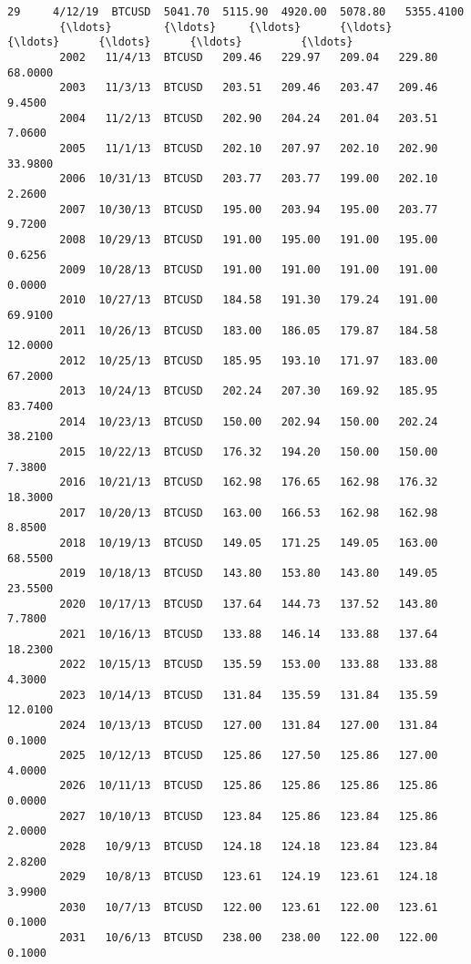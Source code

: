 \documentclass[11pt]{article}
\begin{document}
\begin{Verbatim}[commandchars=\\\{\}]
        29     4/12/19  BTCUSD  5041.70  5115.90  4920.00  5078.80   5355.4100   
        {\ldots}        {\ldots}     {\ldots}      {\ldots}      {\ldots}      {\ldots}      {\ldots}         {\ldots}   
        2002   11/4/13  BTCUSD   209.46   229.97   209.04   229.80     68.0000   
        2003   11/3/13  BTCUSD   203.51   209.46   203.47   209.46      9.4500   
        2004   11/2/13  BTCUSD   202.90   204.24   201.04   203.51      7.0600   
        2005   11/1/13  BTCUSD   202.10   207.97   202.10   202.90     33.9800   
        2006  10/31/13  BTCUSD   203.77   203.77   199.00   202.10      2.2600   
        2007  10/30/13  BTCUSD   195.00   203.94   195.00   203.77      9.7200   
        2008  10/29/13  BTCUSD   191.00   195.00   191.00   195.00      0.6256   
        2009  10/28/13  BTCUSD   191.00   191.00   191.00   191.00      0.0000   
        2010  10/27/13  BTCUSD   184.58   191.30   179.24   191.00     69.9100   
        2011  10/26/13  BTCUSD   183.00   186.05   179.87   184.58     12.0000   
        2012  10/25/13  BTCUSD   185.95   193.10   171.97   183.00     67.2000   
        2013  10/24/13  BTCUSD   202.24   207.30   169.92   185.95     83.7400   
        2014  10/23/13  BTCUSD   150.00   202.94   150.00   202.24     38.2100   
        2015  10/22/13  BTCUSD   176.32   194.20   150.00   150.00      7.3800   
        2016  10/21/13  BTCUSD   162.98   176.65   162.98   176.32     18.3000   
        2017  10/20/13  BTCUSD   163.00   166.53   162.98   162.98      8.8500   
        2018  10/19/13  BTCUSD   149.05   171.25   149.05   163.00     68.5500   
        2019  10/18/13  BTCUSD   143.80   153.80   143.80   149.05     23.5500   
        2020  10/17/13  BTCUSD   137.64   144.73   137.52   143.80      7.7800   
        2021  10/16/13  BTCUSD   133.88   146.14   133.88   137.64     18.2300   
        2022  10/15/13  BTCUSD   135.59   153.00   133.88   133.88      4.3000   
        2023  10/14/13  BTCUSD   131.84   135.59   131.84   135.59     12.0100   
        2024  10/13/13  BTCUSD   127.00   131.84   127.00   131.84      0.1000   
        2025  10/12/13  BTCUSD   125.86   127.50   125.86   127.00      4.0000   
        2026  10/11/13  BTCUSD   125.86   125.86   125.86   125.86      0.0000   
        2027  10/10/13  BTCUSD   123.84   125.86   123.84   125.86      2.0000   
        2028   10/9/13  BTCUSD   124.18   124.18   123.84   123.84      2.8200   
        2029   10/8/13  BTCUSD   123.61   124.19   123.61   124.18      3.9900   
        2030   10/7/13  BTCUSD   122.00   123.61   122.00   123.61      0.1000   
        2031   10/6/13  BTCUSD   238.00   238.00   122.00   122.00      0.1000   
        

\end{Verbatim}
\end{document}

